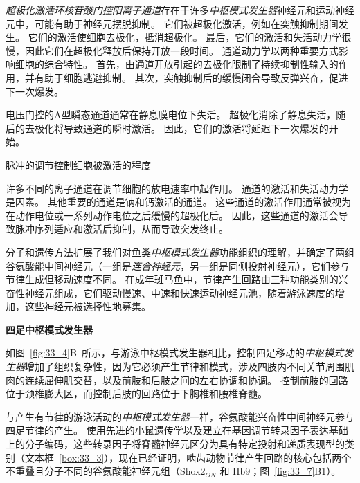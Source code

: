 \begin{proposition}[神经元离子通道有助于中枢模式发生器功能]
	\quad \quad \textit{超极化激活环核苷酸门控阳离子通道}存在于许多\textit{中枢模式发生器}神经元和运动神经元中，可能有助于神经元摆脱抑制。
	它们被超极化激活，例如在突触抑制期间发生。
	它们的激活使细胞去极化，抵消超极化。
	最后，它们的激活和失活动力学很慢，因此它们在超极化释放后保持开放一段时间。
	通道动力学以两种重要方式影响细胞的综合特性。
	首先，由通道开放引起的去极化限制了持续抑制性输入的作用，并有助于细胞逃避抑制。
	其次，突触抑制后的缓慢闭合导致反弹兴奋，促进下一次爆发。
	
	\quad \quad 电压门控的A型瞬态通道通常在静息膜电位下失活。
	超极化消除了静息失活，随后的去极化将导致通道的瞬时激活。
	因此，它们的激活将延迟下一次爆发的开始。
	
	\quad \quad 脉冲的调节控制细胞被激活的程度
	
	\quad \quad 许多不同的离子通道在调节细胞的放电速率中起作用。
	通道的激活和失活动力学是因素。
	其他重要的通道是钠和钙激活的通道。
	这些通道的激活作用通常被视为在动作电位或一系列动作电位之后缓慢的超极化后。
	因此，这些通道的激活会导致脉冲序列适应和激活后抑制，从而导致突发终止。
	
\end{proposition}


分子和遗传方法扩展了我们对鱼类\textit{中枢模式发生器}功能组织的理解，并确定了两组谷氨酸能中间神经元（一组是\textit{连合神经元}，另一组是同侧投射神经元），它们参与节律生成但移动速度不同。
在成年斑马鱼中，节律产生回路由三种功能类别的兴奋性神经元组成，它们驱动慢速、中速和快速运动神经元池，随着游泳速度的增加，这些神经元被选择性地募集。


\textbf{四足中枢模式发生器}

如图~\ref{fig:33_4}B~所示，与游泳中枢模式发生器相比，控制四足移动的\textit{中枢模式发生器}增加了组织复杂性，因为它必须产生节律和模式，涉及四肢内不同关节周围肌肉的连续屈伸肌交替，以及前肢和后肢之间的左右协调和协调。
控制前肢的回路位于颈椎膨大区，而控制后肢的回路位于下胸椎和腰椎脊髓。


与产生有节律的游泳活动的\textit{中枢模式发生器}一样，谷氨酸能兴奋性中间神经元参与四足节律的产生。
使用先进的小鼠遗传学以及建立在基因调节转录因子表达基础上的分子编码，这些转录因子将脊髓神经元区分为具有特定投射和递质表现型的类别（文本框~\ref{box:33_3}），现在已经证明，啮齿动物节律产生回路的核心包括两个不重叠且分子不同的谷氨酸能神经元组（Shox2$_{ON} $ 和 Hb9；图~\ref{fig:33_7}B1）。



